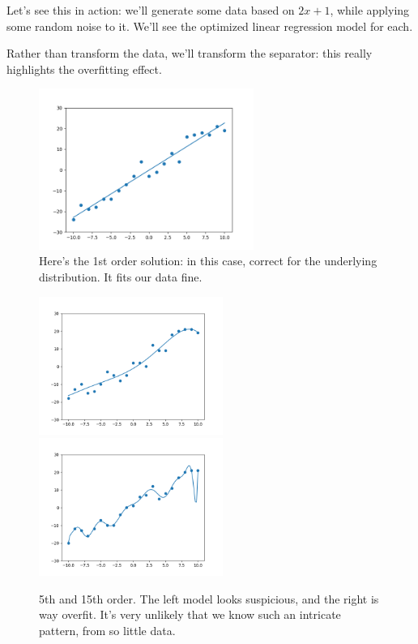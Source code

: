                 Let's see this in action: we'll generate some data based on $2x+1$, while applying some random noise to it. We'll see the optimized linear regression model for each.

                Rather than transform the data, we'll transform the separator: this really highlights the overfitting effect.

                \begin{figure}[H]
                    \centering
                    
                    \includegraphics[width=70mm,scale=0.5]{images/feature_images/order_1_soln.png}
                    \caption*{Here's the 1st order solution: in this case, correct for the underlying distribution. It fits our data fine.}
                \end{figure}

                \begin{figure}[H]
                    \centering
                    
                    \includegraphics[width=60mm,scale=0.5]{images/feature_images/order_5_soln.png}
                    \includegraphics[width=60mm,scale=0.5]{images/feature_images/order_15_soln.png}
                    \caption*{5th and 15th order. The left model looks suspicious, and the right is way overfit. It's very unlikely that we know such an intricate pattern, from so little data.}
                \end{figure}

